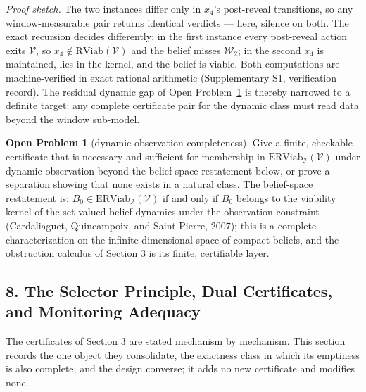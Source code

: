 \documentclass[10pt,twocolumn]{article}
\theoremstyle{definition}
\newtheorem{openproblem}{Open Problem}
\begin{document}
\emph{Proof sketch.} The two instances differ only in \(x_{4}\)'s post-reveal transitions,
so any window-measurable pair returns identical verdicts --- here, silence on both. The
exact recursion decides differently: in the first instance every post-reveal action exits
\(\mathcal{V}\), so \(x_{4} \notin \mathrm{RViab}(\mathcal{V})\) and the belief misses
\(\mathcal{W}_{2}\); in the second \(x_{4}\) is maintained, lies in the kernel, and the
belief is viable. Both computations are machine-verified in exact rational arithmetic
(Supplementary S1, verification record). The residual dynamic gap of
Open Problem~\ref{calc-op:dynamic} is thereby narrowed to a definite target: any complete
certificate pair for the dynamic class must read data beyond the window sub-model.

\begin{openproblem}[dynamic-observation completeness]\label{calc-op:dynamic}
Give a finite, checkable certificate that is necessary and sufficient for membership in \(\mathrm{ERViab}_{\mathcal{I}}(\mathcal{V})\) under dynamic observation beyond the belief-space restatement below, or prove a separation showing that none exists in a natural class. The belief-space restatement is: \(B_{0} \in \mathrm{ERViab}_{\mathcal{I}}(\mathcal{V})\) if and only if \(B_{0}\) belongs to the viability kernel of the set-valued belief dynamics under the observation constraint (Cardaliaguet, Quincampoix, and Saint-Pierre, 2007); this is a complete characterization on the infinite-dimensional space of compact beliefs, and the obstruction calculus of Section 3 is its finite, certifiable layer.
\end{openproblem}

\subsection{8. The Selector Principle, Dual Certificates, and Monitoring Adequacy}\label{calc-selector-principle}

The certificates of Section 3 are stated mechanism by mechanism. This section records the one object they consolidate, the exactness class in which its emptiness is also complete, and the design converse; it adds no new certificate and modifies none.
\end{document}
